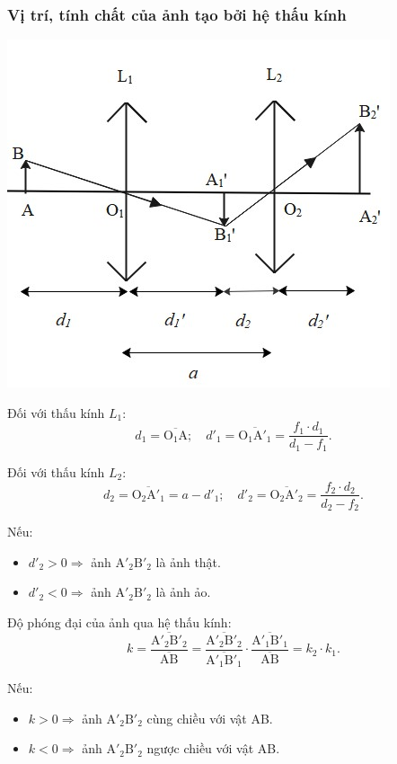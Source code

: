 \subsubsection{Vị trí, tính chất của ảnh tạo bởi hệ thấu kính}
\begin{center}
	\includegraphics[scale=0.8]{../figs/VN11-PH-39-L-027-1-h29.jpg}
\end{center}

Đối với thấu kính $L_1$:
$$d_1=\overline{\text{O}_1\text{A}};\quad d'_1=\overline{\text{O}_1\text{A}'_1}=\dfrac{f_1\cdot d_1}{d_1-f_1}.$$

Đối với thấu kính $L_2$:
$$d_2=\overline{\text{O}_2\text{A}'_1}=a-d'_1;\quad d'_2=\overline{\text{O}_2\text{A}'_2}=\dfrac{f_2\cdot d_2}{d_2-f_2}.$$

Nếu:
\begin{itemize}
	\item $d'_2>0\Rightarrow$ ảnh $\text{A}'_2\text{B}'_2$ là ảnh thật. 
	\item $d'_2<0\Rightarrow$ ảnh $\text{A}'_2\text{B}'_2$ là ảnh ảo.
\end{itemize}

Độ phóng đại của ảnh qua hệ thấu kính:
$$k=\dfrac{\overline{\text{A}'_2\text{B}'_2}}{\overline{\text{AB}}}=\dfrac{\overline{\text{A}'_2\text{B}'_2}}{\overline{\text{A}'_1\text{B}'_1}}\cdot  \dfrac{\overline{\text{A}'_1\text{B}'_1}}{\overline{\text{AB}}}=k_2\cdot k_1.$$

Nếu:
\begin{itemize}
	\item $k>0\Rightarrow$ ảnh $\text{A}'_2\text{B}'_2$ cùng chiều với vật AB. 
	\item $k<0\Rightarrow$ ảnh $\text{A}'_2\text{B}'_2$ ngược chiều với vật AB.
\end{itemize}


